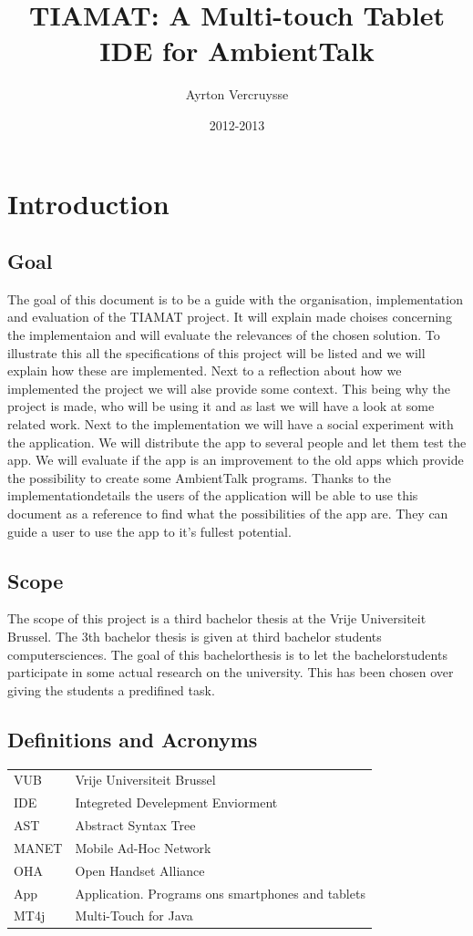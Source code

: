 \documentclass[a4paper,12pt]{report}
\author{Ayrton Vercruysse}
\title{TIAMAT: A Multi-touch Tablet IDE for AmbientTalk}
\date{2012-2013}
\begin{document}
\maketitlepage
\tableofcontents
\chapter{Introduction}
\section{Goal}
The goal of this document is to be a guide with the organisation, implementation and evaluation of the TIAMAT project. It will explain made choises concerning the implementaion and will evaluate
the relevances of the chosen solution. To illustrate this all the specifications of this project will be listed and we will explain how these are implemented.
Next to a reflection about how we implemented the project we will alse provide some context. This being why the project is made, who will be using it and as last we will have a look at some 
related work.
Next to the implementation we will have a social experiment with the application. We will distribute the app to several people and let them test the app. We will evaluate if the app is an 
improvement to the old apps which provide the possibility to create some AmbientTalk programs. 
Thanks to the implementationdetails the users of the application will be able to use this document as a reference to find what the possibilities of the app are. They can guide a user to use the
app to it's fullest potential.

\section{Scope}
The scope of this project is a third bachelor thesis at the Vrije Universiteit Brussel. The 3th bachelor thesis is given at third bachelor students computersciences. The goal of this bachelorthesis
is to let the bachelorstudents  participate in some actual research on the university. This has been chosen over giving the students a predifined task.
\section{Definitions and Acronyms}

\begin{tabular}{ l l }
  VUB & Vrije Universiteit Brussel \\
  IDE & Integreted Develepment Enviorment \\
  AST & Abstract Syntax Tree \\
  MANET 	& Mobile Ad-Hoc Network \\
  OHA & Open Handset Alliance \\
  App & Application. Programs ons smartphones and tablets \\
  MT4j & Multi-Touch for Java \\
\end{tabular}
\end{document}

